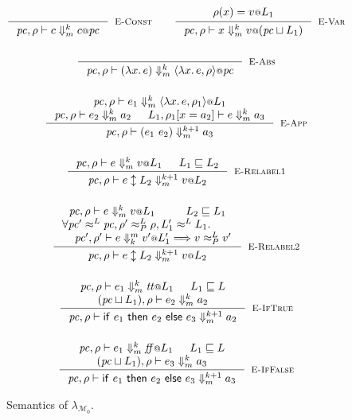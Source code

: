 \documentclass{article}
\makeatletter
\theoremstyle{definition}
\newcommand{\at}{\ensuremath{{\scriptstyle{@}}}}
\newcommand{\pc}{\ensuremath{{\mathit{pc}}}}
\makeatother
\begin{document}
\begin{figure}[ht]
  \centering
  \begin{gather*}
    \inference{}{
      \pc, \rho |-
      c
      \Downarrow^{k}_{m}
      c \at \pc
    }[\textsc{E-Const}]
    \qquad
    \inference{
      {\begin{array}{l}
          \rho(x) = v \at L_1
        \end{array}}
    }{
      \pc, \rho |-
      x
      \Downarrow^{k}_{m}
      v \at (\pc \sqcup L_1)
    }[\textsc{E-Var}]
    \\[3ex]
    \inference{}{
      \pc, \rho |-
      (\lambda{x}.\, e)
      \Downarrow^{k}_{m}
      \langle{\lambda{x}.\, e, \rho\rangle} \at \pc
    }[\textsc{E-Abs}]
    \\[3ex]
    \inference{
      \pc, \rho |-
      e_1
      \Downarrow^{k}_{m}
      \langle{\lambda{x}.\, e, \rho_1\rangle} \at L_1
      \\
      \pc, \rho |-
      e_2 \Downarrow^{k}_{m} a_2
      &
      L_1, \rho_1[x = a_2] |-
      e
      \Downarrow^{k}_{m}
      a_3
    }{
      \pc, \rho |-
      (e_1\ e_2)
      \Downarrow^{k+1}_{m}
      a_3
    }[\textsc{E-App}]
    \\[3ex]
    \inference{
      \pc, \rho |-
      e
      \Downarrow^{k}_{m}
      v \at L_1
      &
      L_1 \sqsubseteq L_2
    }{
      \pc, \rho |-
      e \updownarrow L_2
      \Downarrow^{k+1}_{m}
      v \at L_2
    }[\textsc{E-Relabel1}]
    \\[3ex]
    \inference{
      \pc, \rho |-
      e
      \Downarrow^{k}_{m}
      v \at L_1
      &
      L_2 \sqsubseteq L_1
      \\
      \forall{\pc' \approx^{L} \pc,
        \rho' \approx^{L}_{P} \rho,
        L_1' \approx^{L} L_1}.
      \qquad\\\quad
      \pc', \rho' |-
      e
      \Downarrow^{m}_{k}
      v' \at L_1'
      ==>
      v \approx^{L}_{P} v'
    }{
      \pc, \rho |-
      e \updownarrow L_2
      \Downarrow^{k+1}_{m}
      v \at L_2
    }[\textsc{E-Relabel2}]
    \\[3ex]
    \inference{
      \pc, \rho |- e_1 \Downarrow^{k}_{m} \mathit{tt} \at L_1
      &
      L_1 \sqsubseteq L
      \\
      (\pc \sqcup L_1), \rho |- e_2 \Downarrow^{k}_{m} a_2
    }{
      \pc, \rho |-
      \mathsf{if}\ e_1\ \mathsf{then}\ e_2\ \mathsf{else}\ e_3
      \Downarrow^{k+1}_{m}
      a_2
    }[\textsc{E-IfTrue}]
    \\[3ex]
    \inference{
      \pc, \rho |- e_1 \Downarrow^{k}_{m} \mathit{ff} \at L_1
      &
      L_1 \sqsubseteq L
      \\
      (\pc \sqcup L_1), \rho |- e_3 \Downarrow^{k}_{m} a_3
    }{
      \pc, \rho |-
      \mathsf{if}\ e_1\ \mathsf{then}\ e_2\ \mathsf{else}\ e_3
      \Downarrow^{k+1}_{m}
      a_3
    }[\textsc{E-IfFalse}]
  \end{gather*}
  \caption{Semantics of $\lambda_{\mathcal{M}_{0}}$.}
  \label{fig:semantics}
\end{figure}
\end{document}
